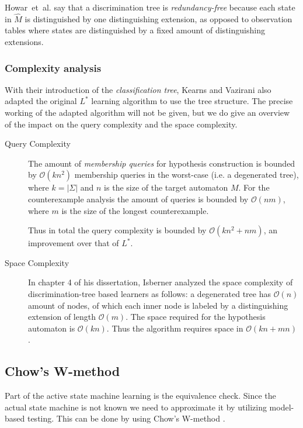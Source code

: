 \documentclass[multi,crop=false,class=article]{standalone}
\begin{document}
Howar~et~al. say that a discrimination tree is \textit{redundancy-free} because
each state in $\hat M$ is distinguished by one distinguishing extension, as
opposed to observation tables where states are distinguished by a fixed amount
of distinguishing extensions\cite{Howar14}.

\subsubsection{Complexity analysis}
\label{sec:complexity-analysis}
With their introduction of the \textit{classification tree}, Kearns and Vazirani
also adapted the original $L^*$ learning algorithm to use the tree
structure\cite{Kearns94}. The precise working of the adapted algorithm will not
be given, but we do give an overview of the impact on the query complexity and
the space complexity.

\begin{description}
\item[Query Complexity] The amount of \textit{membership queries} for hypothesis
  construction is bounded by $\mathcal{O}(kn^2)$ membership queries in the
  worst-case (i.e. a degenerated tree)\cite{Howar14,Kearns94,Isberner14b}, where
  $k = |\Sigma |$ and $n$ is the size of the target automaton $M$. For the
  counterexample analysis the amount of queries is bounded by $\mathcal{O}(nm)$,
  where $m$ is the size of the longest counterexample\cite{Kearns94}.

  Thus in total the query complexity is bounded by $\mathcal{O}(kn^2 + nm)$, an
  improvement over that of $L^*$.
\item[Space Complexity] In chapter 4 of his dissertation, Isberner analyzed the
  space complexity of discrimination-tree based learners as follows: a
  degenerated tree has $\mathcal{O}(n)$ amount of nodes, of which each inner
  node is labeled by a distinguishing extension of length
  $\mathcal{O}(m)$\cite{Isberner15}.  The space required for the hypothesis
  automaton is $\mathcal{O}(kn)$\cite{Isberner15}. Thus the algorithm requires
  space in $\mathcal{O}(kn + mn)$\cite{Isberner14b,Isberner15}.
\end{description}

\subsection{Chow's W-method}
Part of the active state machine learning is the equivalence check.
Since the actual state machine is not known we need to approximate it by
utilizing model-based testing.
This can be done by using Chow's W-method \cite{deRuiter15, Chow78}.
\end{document}
